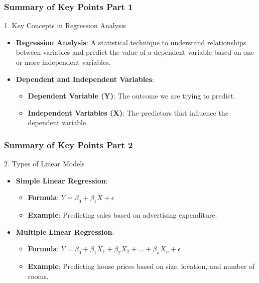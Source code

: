 \documentclass[aspectratio=169]{beamer}
\begin{document}
\begin{frame}[fragile]
    \frametitle{Summary of Key Points Part 1}
    \begin{block}{1. Key Concepts in Regression Analysis}
        \begin{itemize}
            \item \textbf{Regression Analysis}: A statistical technique to understand relationships between variables and predict the value of a dependent variable based on one or more independent variables.
            \item \textbf{Dependent and Independent Variables}:
                \begin{itemize}
                    \item \textbf{Dependent Variable (Y)}: The outcome we are trying to predict.
                    \item \textbf{Independent Variables (X)}: The predictors that influence the dependent variable.
                \end{itemize}
        \end{itemize}
    \end{block}
\end{frame}

\begin{frame}[fragile]
    \frametitle{Summary of Key Points Part 2}
    \begin{block}{2. Types of Linear Models}
        \begin{itemize}
            \item \textbf{Simple Linear Regression}: 
                \begin{itemize}
                    \item \textbf{Formula}: $Y = \beta_0 + \beta_1 X + \epsilon$
                    \item \textbf{Example}: Predicting sales based on advertising expenditure.
                \end{itemize}
            \item \textbf{Multiple Linear Regression}: 
                \begin{itemize}
                    \item \textbf{Formula}: $Y = \beta_0 + \beta_1 X_1 + \beta_2 X_2 + \ldots + \beta_n X_n + \epsilon$
                    \item \textbf{Example}: Predicting house prices based on size, location, and number of rooms.
                \end{itemize}
        \end{itemize}
    \end{block}
\end{frame}
\end{document}
